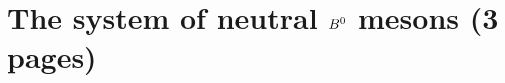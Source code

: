 
\section{The system of neutral \texorpdfstring{${{B}^0}$}{B0} mesons (3 pages)}
\label{sec:cpviolation:neutralBmesons}